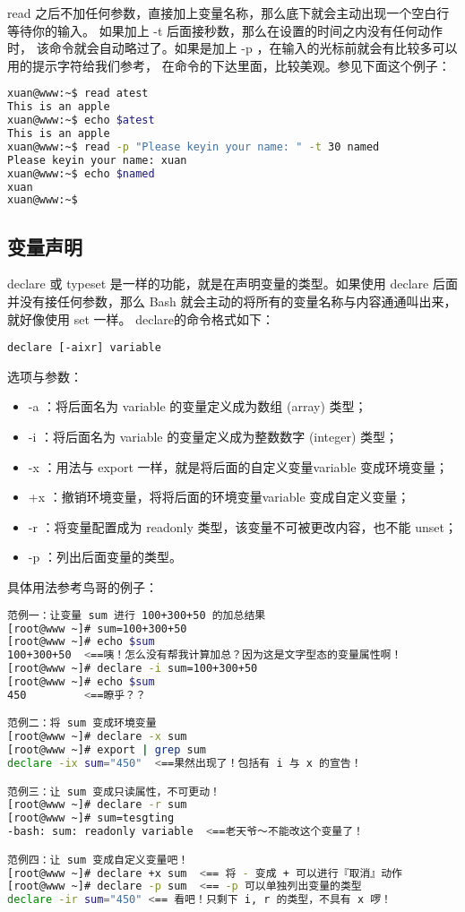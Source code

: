 read 之后不加任何参数，直接加上变量名称，那么底下就会主动出现一个空白行等待你的输入。 如果加上 -t 后面接秒数，那么在设置的时间之内没有任何动作时， 该命令就会自动略过了。如果是加上 -p ，在输入的光标前就会有比较多可以用的提示字符给我们参考， 在命令的下达里面，比较美观。参见下面这个例子： 
\begin{lstlisting}[language=sh]
xuan@www:~$ read atest
This is an apple
xuan@www:~$ echo $atest
This is an apple
xuan@www:~$ read -p "Please keyin your name: " -t 30 named
Please keyin your name: xuan
xuan@www:~$ echo $named 
xuan
xuan@www:~$ 
\end{lstlisting}



\subsection{变量声明}
declare 或 typeset 是一样的功能，就是在声明变量的类型。如果使用 declare 后面并没有接任何参数，那么 Bash 就会主动的将所有的变量名称与内容通通叫出来，就好像使用 set 一样。 declare的命令格式如下：

\verb|declare [-aixr] variable|

选项与参数：
\begin{itemize}
\item -a  ：将后面名为 variable 的变量定义成为数组 (array) 类型；
\item -i  ：将后面名为 variable 的变量定义成为整数数字 (integer) 类型；
\item -x  ：用法与 export 一样，就是将后面的自定义变量variable 变成环境变量；
\item +x ：撤销环境变量，将将后面的环境变量variable 变成自定义变量；
\item -r  ：将变量配置成为 readonly 类型，该变量不可被更改内容，也不能 unset；
\item -p ：列出后面变量的类型。
\end{itemize}

具体用法参考鸟哥的例子：
\begin{lstlisting}[language=sh]
范例一：让变量 sum 进行 100+300+50 的加总结果
[root@www ~]# sum=100+300+50
[root@www ~]# echo $sum
100+300+50  <==咦！怎么没有帮我计算加总？因为这是文字型态的变量属性啊！
[root@www ~]# declare -i sum=100+300+50
[root@www ~]# echo $sum
450         <==瞭乎？？

范例二：将 sum 变成环境变量
[root@www ~]# declare -x sum
[root@www ~]# export | grep sum
declare -ix sum="450"  <==果然出现了！包括有 i 与 x 的宣告！

范例三：让 sum 变成只读属性，不可更动！
[root@www ~]# declare -r sum
[root@www ~]# sum=tesgting
-bash: sum: readonly variable  <==老天爷～不能改这个变量了！

范例四：让 sum 变成自定义变量吧！
[root@www ~]# declare +x sum  <== 将 - 变成 + 可以进行『取消』动作
[root@www ~]# declare -p sum  <== -p 可以单独列出变量的类型
declare -ir sum="450" <== 看吧！只剩下 i, r 的类型，不具有 x 啰！
\end{lstlisting}


